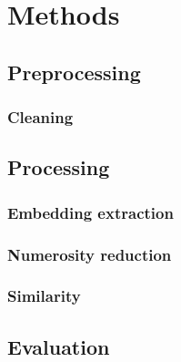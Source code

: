 \documentclass[\main/main.tex]{subfiles}
\begin{document}
\chapter{Methods}
\section{Preprocessing}
\subsection{Cleaning}
\section{Processing}
\subsection{Embedding extraction}
\subsection{Numerosity reduction}
\subsection{Similarity}
\section{Evaluation}
\end{document}
